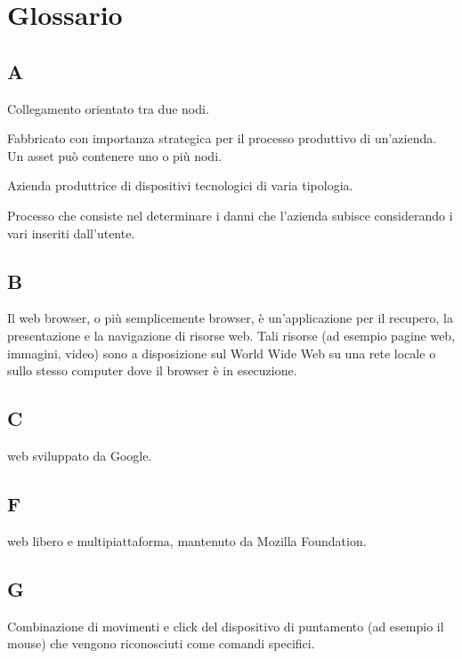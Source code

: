 \section{Glossario}
	\subsection{A}
		Collegamento orientato tra due nodi.
		
		Fabbricato con importanza strategica per il processo produttivo di un'azienda. Un asset può contenere uno o più nodi.
		
		Azienda produttrice di dispositivi tecnologici di varia tipologia.
		
		Processo che consiste nel determinare i danni che l'azienda subisce considerando i vari  inseriti dall'utente.
	\subsection{B}
		Il web browser, o più semplicemente browser, è un'applicazione per il recupero, la presentazione e la navigazione di risorse web. Tali risorse (ad esempio pagine web, immagini, video) sono a disposizione sul World Wide Web su una rete locale o sullo stesso computer dove il browser è in esecuzione. 
	\subsection{C}
		 web sviluppato da Google.
	\subsection{F}
		 web  libero e multipiattaforma, mantenuto da Mozilla Foundation.
	\subsection{G}
		Combinazione di movimenti e click del dispositivo di puntamento (ad esempio il mouse) che vengono riconosciuti come comandi specifici.
		
